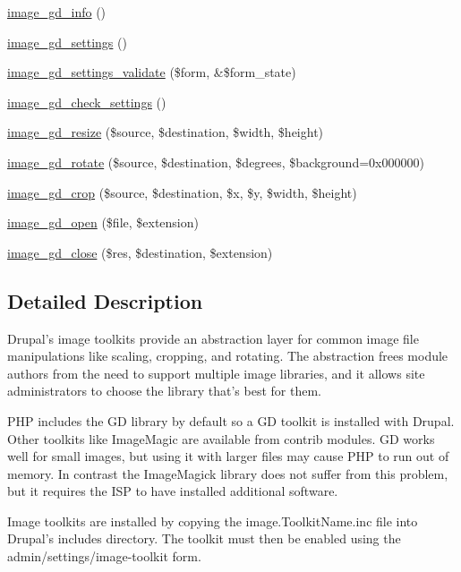 \begin{CompactItemize}
\item 
\hyperlink{group__image_g7d5a8bb446703a5cea5524df48af65e1}{image\_\-gd\_\-info} ()
\item 
\hyperlink{group__image_g2a492c31e41c59af2b7e976e28886b15}{image\_\-gd\_\-settings} ()
\item 
\hyperlink{group__image_gab4f4ec4e8bc9abc51939a4194848fbb}{image\_\-gd\_\-settings\_\-validate} (\$form, \&\$form\_\-state)
\item 
\hyperlink{group__image_g1926e8b1932480b81427c1301e8eb4dc}{image\_\-gd\_\-check\_\-settings} ()
\item 
\hyperlink{group__image_g0277cb4fc23069a240a2438a97b079ff}{image\_\-gd\_\-resize} (\$source, \$destination, \$width, \$height)
\item 
\hyperlink{group__image_gce49547cf14336f64e2fdeb47c8ce440}{image\_\-gd\_\-rotate} (\$source, \$destination, \$degrees, \$background=0x000000)
\item 
\hyperlink{group__image_gcebe63cdcfcb41f3896fc16a128dde75}{image\_\-gd\_\-crop} (\$source, \$destination, \$x, \$y, \$width, \$height)
\item 
\hyperlink{group__image_gbb45a7fb30f1066896d524d9b4069622}{image\_\-gd\_\-open} (\$file, \$extension)
\item 
\hyperlink{group__image_ga23594d3a02ab3e49647cb33f1e8590f}{image\_\-gd\_\-close} (\$res, \$destination, \$extension)
\end{CompactItemize}


\subsection{Detailed Description}
Drupal's image toolkits provide an abstraction layer for common image file manipulations like scaling, cropping, and rotating. The abstraction frees module authors from the need to support multiple image libraries, and it allows site administrators to choose the library that's best for them.

PHP includes the GD library by default so a GD toolkit is installed with Drupal. Other toolkits like ImageMagic are available from contrib modules. GD works well for small images, but using it with larger files may cause PHP to run out of memory. In contrast the ImageMagick library does not suffer from this problem, but it requires the ISP to have installed additional software.

Image toolkits are installed by copying the image.ToolkitName.inc file into Drupal's includes directory. The toolkit must then be enabled using the admin/settings/image-toolkit form.

